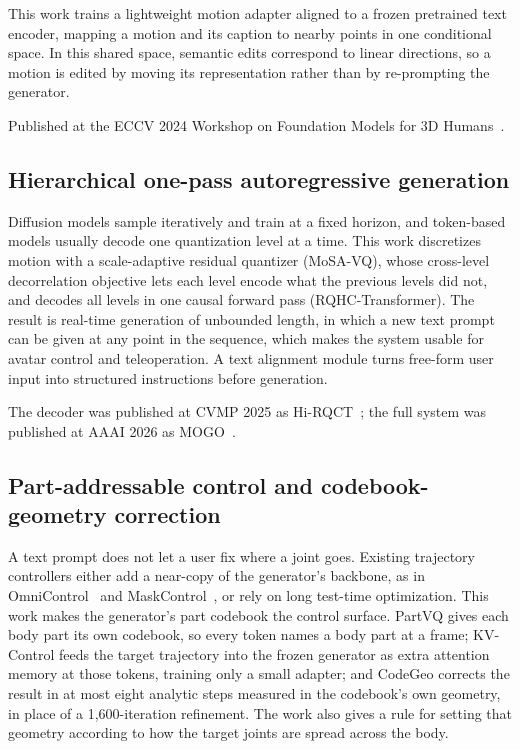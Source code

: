 \documentclass[11pt,a4paper]{report}
\begin{document}
This work trains a lightweight motion adapter aligned to a frozen pretrained
text encoder, mapping a motion and its caption to nearby points in one
conditional space. In this shared space, semantic edits correspond to linear
directions, so a motion is edited by moving its representation rather than by
re-prompting the generator.

Published at the ECCV 2024 Workshop on Foundation Models for 3D
Humans~\cite{sun2024mcre}.

\subsection{Hierarchical one-pass autoregressive generation}

Diffusion models sample iteratively and train at a fixed horizon, and
token-based models usually decode one quantization level at a time. This work
discretizes motion with a scale-adaptive residual quantizer (MoSA-VQ), whose
cross-level decorrelation objective lets each level encode what the previous
levels did not, and decodes all levels in one causal forward pass
(RQHC-Transformer). The result is real-time generation of unbounded length, in
which a new text prompt can be given at any point in the sequence, which makes
the system usable for avatar control and teleoperation. A text alignment module
turns free-form user input into structured instructions before generation.

The decoder was published at CVMP 2025 as Hi-RQCT~\cite{sun2025hirqct}; the full
system was published at AAAI 2026 as MOGO~\cite{sun2025mogo}.

\subsection{Part-addressable control and codebook-geometry correction}

A text prompt does not let a user fix where a joint goes. Existing trajectory
controllers either add a near-copy of the generator's backbone, as in
OmniControl~\cite{xie2024omnicontrol} and
MaskControl~\cite{pinyoanuntapong2025maskcontrol}, or rely on long test-time
optimization. This work makes the generator's part codebook the control
surface. PartVQ gives each body part its own codebook, so every token names a
body part at a frame; KV-Control feeds the target trajectory into the frozen
generator as extra attention memory at those tokens, training only a small
adapter; and CodeGeo corrects the result in at most eight analytic steps
measured in the codebook's own geometry, in place of a 1,600-iteration
refinement. The work also gives a rule for setting that geometry according to
how the target joints are spread across the body.
\end{document}
